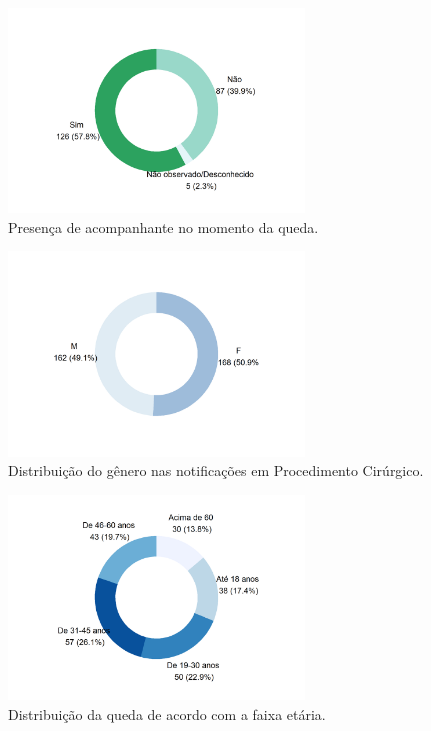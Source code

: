 \documentclass[
  a4paper]{article}
\begin{document}
\begin{figure}[H]
\caption{Presença de acompanhante no momento da queda.}
\includegraphics[width=0.7\textwidth]{Imagens/queda_acomp.png}
\end{figure}

\begin{figure}[H]
\caption{Distribuição do gênero nas notificações em Procedimento Cirúrgico.}
\includegraphics[width=0.7\textwidth]{Imagens/cirurg_SEXO.png}
\end{figure}

\begin{figure}[H]
\caption{Distribuição da queda de acordo com a faixa etária.}
\includegraphics[width=0.7\textwidth]{Imagens/queda_faixa_etaria.png}
\end{figure}
\end{document}
